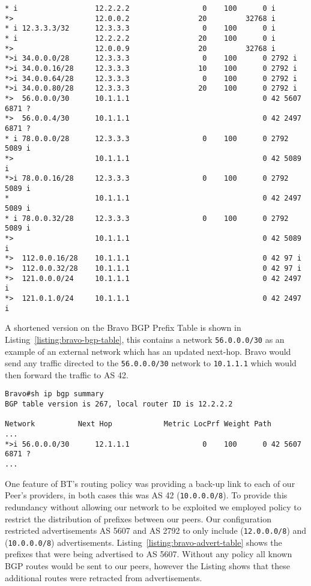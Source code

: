 \begin{lstlisting}[caption={Extract of Alpha BGP Table}, label={listing:bgp-table}]
* i                  12.2.2.2                 0    100      0 i
*>                   12.0.0.2                20         32768 i
* i 12.3.3.3/32      12.3.3.3                 0    100      0 i
* i                  12.2.2.2                20    100      0 i
*>                   12.0.0.9                20         32768 i
*>i 34.0.0.0/28      12.3.3.3                 0    100      0 2792 i
*>i 34.0.0.16/28     12.3.3.3                10    100      0 2792 i
*>i 34.0.0.64/28     12.3.3.3                 0    100      0 2792 i
*>i 34.0.0.80/28     12.3.3.3                20    100      0 2792 i
*>  56.0.0.0/30      10.1.1.1                               0 42 5607 6871 ?
*>  56.0.0.4/30      10.1.1.1                               0 42 2497 6871 ?
* i 78.0.0.0/28      12.3.3.3                 0    100      0 2792 5089 i
*>                   10.1.1.1                               0 42 5089 i
*>i 78.0.0.16/28     12.3.3.3                 0    100      0 2792 5089 i
*                    10.1.1.1                               0 42 2497 5089 i
* i 78.0.0.32/28     12.3.3.3                 0    100      0 2792 5089 i
*>                   10.1.1.1                               0 42 5089 i
*>  112.0.0.16/28    10.1.1.1                               0 42 97 i
*>  112.0.0.32/28    10.1.1.1                               0 42 97 i
*>  121.0.0.0/24     10.1.1.1                               0 42 2497 i
*>  121.0.1.0/24     10.1.1.1                               0 42 2497 i
\end{lstlisting}

A shortened version on the Bravo BGP Prefix Table is shown in
Listing~\ref{listing:bravo-bgp-table}, this contains a network
\texttt{56.0.0.0/30} as an example of an external network which has an updated
next-hop. Bravo would send any traffic directed to the \texttt{56.0.0.0/30}
network to \texttt{10.1.1.1} which would then forward the traffic to AS 42.

\begin{lstlisting}[caption={Extract of Bravo BGP Table}, label={listing:bravo-bgp-table}]
Bravo#sh ip bgp summary
BGP table version is 267, local router ID is 12.2.2.2

Network          Next Hop            Metric LocPrf Weight Path
...
*>i 56.0.0.0/30      12.1.1.1                 0    100      0 42 5607 6871 ?
...
\end{lstlisting}

One feature of BT's routing policy was providing a back-up link to each of our
Peer's providers, in both cases this was AS 42 (\texttt{10.0.0.0/8}). To
provide this redundancy without allowing our network to be exploited we
employed policy to restrict the distribution of prefixes between our peers. Our
configuration restricted advertisements AS 5607 and AS 2792 to only include
(\texttt{12.0.0.0/8}) and (\texttt{10.0.0.0/8}) advertisements.
Listing~\ref{listing:bravo-advert-table} shows the prefixes that were being
advertised to AS 5607. Without any policy all known BGP routes would be sent to
our peers, however the Listing shows that these additional routes were
retracted from advertisements.

